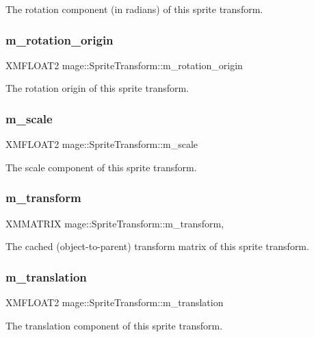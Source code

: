 The rotation component (in radians) of this sprite transform. \hypertarget{classmage_1_1_sprite_transform_ae51ebd0226ef4b569b6a66884823bd18}{}\label{classmage_1_1_sprite_transform_ae51ebd0226ef4b569b6a66884823bd18} 
\subsubsection{\texorpdfstring{m\+\_\+rotation\+\_\+origin}{m\_rotation\_origin}}
{\footnotesize\ttfamily X\+M\+F\+L\+O\+A\+T2 mage\+::\+Sprite\+Transform\+::m\+\_\+rotation\+\_\+origin\hspace{0.3cm}{\ttfamily [private]}}

The rotation origin of this sprite transform. \hypertarget{classmage_1_1_sprite_transform_a7532d4d41d02b5fa6f31eeb4fd4fd886}{}\label{classmage_1_1_sprite_transform_a7532d4d41d02b5fa6f31eeb4fd4fd886} 
\subsubsection{\texorpdfstring{m\+\_\+scale}{m\_scale}}
{\footnotesize\ttfamily X\+M\+F\+L\+O\+A\+T2 mage\+::\+Sprite\+Transform\+::m\+\_\+scale\hspace{0.3cm}{\ttfamily [private]}}

The scale component of this sprite transform. \hypertarget{classmage_1_1_sprite_transform_ad2fec50a82772514da9399ff31703f3d}{}\label{classmage_1_1_sprite_transform_ad2fec50a82772514da9399ff31703f3d} 
\subsubsection{\texorpdfstring{m\+\_\+transform}{m\_transform}}
{\footnotesize\ttfamily X\+M\+M\+A\+T\+R\+IX mage\+::\+Sprite\+Transform\+::m\+\_\+transform\hspace{0.3cm}{\ttfamily [mutable]}, {\ttfamily [private]}}

The cached (object-\/to-\/parent) transform matrix of this sprite transform. \hypertarget{classmage_1_1_sprite_transform_a7642907ec8ae9685bb7c56675607045b}{}\label{classmage_1_1_sprite_transform_a7642907ec8ae9685bb7c56675607045b} 
\subsubsection{\texorpdfstring{m\+\_\+translation}{m\_translation}}
{\footnotesize\ttfamily X\+M\+F\+L\+O\+A\+T2 mage\+::\+Sprite\+Transform\+::m\+\_\+translation\hspace{0.3cm}{\ttfamily [private]}}

The translation component of this sprite transform. 